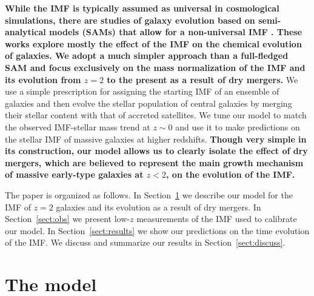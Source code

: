 \documentclass[usenatbib, letters]{mnras}
\def\Sref#1{Section~\ref{#1}\xspace}
\begin{document}
{\bf While the IMF is typically assumed as universal in cosmological simulations, there are studies of galaxy evolution based on semi-analytical models (SAMs) that allow for a non-universal IMF \citep{Nag++05, Bek13, Cha++15, GargiuloI++15, Fon++16}. These works explore mostly the effect of the IMF on the chemical evolution of galaxies.
We adopt a much simpler approach than a full-fledged SAM and focus exclusively on the mass normalization of the IMF and its evolution from $z=2$ to the present as a result of dry mergers.}
We use a simple prescription for assigning the starting IMF of an ensemble of galaxies and then evolve the stellar population of central galaxies by merging their stellar content with that of accreted satellites.
We tune our model to match the observed IMF-stellar mass trend at $z\sim0$ and use it to make predictions on the stellar IMF of massive galaxies at higher redshifts.
{\bf Though very simple in its construction, our model allows us to clearly isolate the effect of dry mergers, which are believed to represent the main growth mechanism of massive early-type galaxies at $z < 2$, on the evolution of the IMF.}

The paper is organized as follows.  In \Sref{sect:model} we describe our model for the IMF of $z=2$ galaxies and its evolution as a result of dry mergers.
In \Sref{sect:obs} we present low-$z$ measurements of the IMF used to calibrate our model.
In \Sref{sect:results} we show our predictions on the time evolution of the IMF.
We discuss and summarize our results in \Sref{sect:discuss}.


\section{The model}\label{sect:model}
\end{document}
